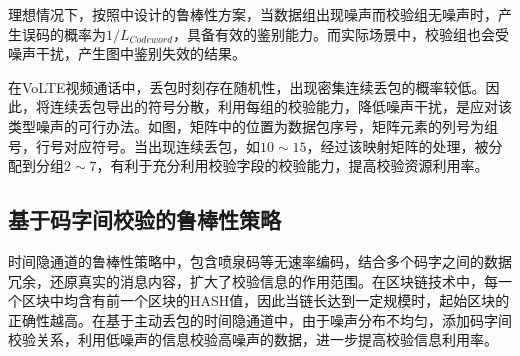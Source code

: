 理想情况下，按照中设计的鲁棒性方案，当数据组出现噪声而校验组无噪声时，产生误码的概率为$1/L_{Codeword}$，具备有效的鉴别能力。而实际场景中，校验组也会受噪声干扰，产生图中鉴别失效的结果。


在VoLTE视频通话中，丢包时刻存在随机性，出现密集连续丢包的概率较低。因此，将连续丢包导出的符号分散，利用每组的校验能力，降低噪声干扰，是应对该类型噪声的可行办法。如图，矩阵中的位置为数据包序号，矩阵元素的列号为组号，行号对应符号。当出现连续丢包，如$10\sim 15$，经过该映射矩阵的处理，被分配到分组$2\sim 7$，有利于充分利用校验字段的校验能力，提高校验资源利用率。

\subsection{基于码字间校验的鲁棒性策略}
\label{chap:hash:motivation:robustness}

时间隐通道的鲁棒性策略中，包含喷泉码等无速率编码，结合多个码字之间的数据冗余，还原真实的消息内容，扩大了校验信息的作用范围。在区块链技术中，每一个区块中均含有前一个区块的HASH值，因此当链长达到一定规模时，起始区块的正确性越高。在基于主动丢包的时间隐通道中，由于噪声分布不均匀，添加码字间校验关系，利用低噪声的信息校验高噪声的数据，进一步提高校验信息利用率。


